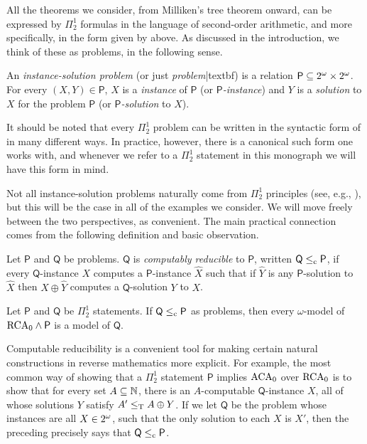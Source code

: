 All the theorems we consider, from Milliken's tree theorem onward, can be expressed by $\Pi^1_2$ formulas in the language of second-order arithmetic, and more specifically, in the form given by  above. As discussed in the introduction, we think of these as problems, in the following sense.

\begin{definition}
	An \emph{instance-solution problem}	(or just \emph{problem}|textbf) is a relation $\mathsf{P} \subseteq {2^{\omega}} \times {2^{\omega}}$. For every $(X,Y) \in \mathsf{P}$, $X$ is a \emph{instance} of $\mathsf{P}$ (or \emph{$\mathsf{P}$-instance}) and $Y$ is a \emph{solution} to $X$ for the problem $\mathsf{P}$ (or \emph{$\mathsf{P}$-solution} to $X$).
\end{definition}

\noindent It should be noted that every $\Pi^1_2$ problem can be written in the syntactic form of  in many different ways. In practice, however, there is a canonical such form one works with, and whenever we refer to a $\Pi^1_2$ statement in this monograph we will have this form in mind.

Not all instance-solution problems naturally come from $\Pi^1_2$ principles (see, e.g., \cite{GohTA,Marcone2020}), but this will be the case in all of the examples we consider. We will move freely between the two perspectives, as convenient. The main practical connection comes from the following definition and basic observation.

\begin{definition}
	Let $\mathsf{P}$ and $\mathsf{Q}$ be problems. $\mathsf{Q}$ is \emph{computably reducible} to $\mathsf{P}$, written $\mathsf{Q} \leq_{\text{\upshape c}} \mathsf{P}$\index{$\cred$}, if every $\mathsf{Q}$-instance $X$ computes a $\mathsf{P}$-instance $\widehat{X}$ such that if $\widehat{Y}$ is any $\mathsf{P}$-solution to $\widehat{X}$ then $X \oplus \widehat{Y}$ computes a $\mathsf{Q}$-solution $Y$ to $X$.
\end{definition}

\begin{lemma}
	Let $\mathsf{P}$ and $\mathsf{Q}$ be $\Pi^1_2$ statements. If $\mathsf{Q} \leq_{\text{\upshape c}} \mathsf{P}$ as problems, then every $\omega$-model of $\mathrm{RCA}_0 \wedge \mathsf{P}$ is a model of $\mathsf{Q}$.
\end{lemma}

\noindent Computable reducibility is a convenient tool for making certain natural constructions in reverse mathematics more explicit. For example, the most common way of showing that a $\Pi^1_2$ statement $\mathsf{P}$ implies $\mathrm{ACA}_0$ over $\mathrm{RCA}_0$ is to show that for every set $A \subseteq \mathbb{N}$, there is an $A$-computable $\mathsf{Q}$-instance $X$, all of whose solutions $Y$ satisfy $A' \leq_{\text{\upshape T}} A \oplus Y$. If we let $\mathsf{Q}$ be the problem whose instances are all $X \in {2^{\omega}}$, such that the only solution to each $X$ is $X'$, then the preceding precisely says that $\mathsf{Q} \leq_{\text{\upshape c}} \mathsf{P}$.


